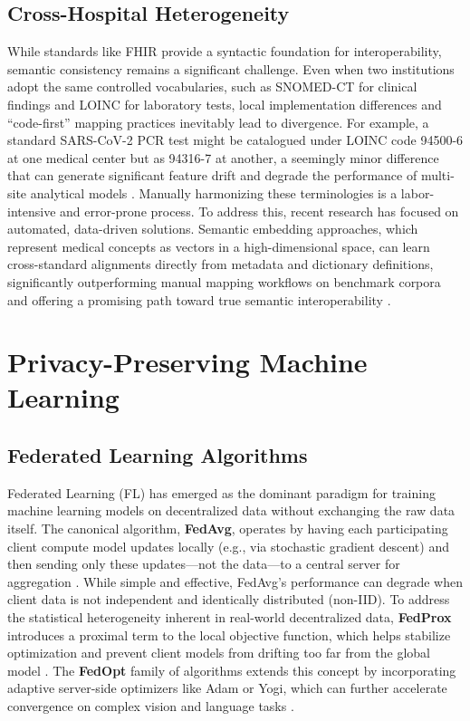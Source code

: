\documentclass[12pt]{report}
\begin{document}
\subsection{Cross-Hospital Heterogeneity}
While standards like FHIR provide a syntactic foundation for interoperability, semantic consistency remains a significant challenge. Even when two institutions adopt the same controlled vocabularies, such as SNOMED-CT for clinical findings and LOINC for laboratory tests, local implementation differences and “code-first” mapping practices inevitably lead to divergence. For example, a standard SARS-CoV-2 PCR test might be catalogued under LOINC code 94500-6 at one medical center but as 94316-7 at another, a seemingly minor difference that can generate significant feature drift and degrade the performance of multi-site analytical models \cite{Zhang2024Harmonize}. Manually harmonizing these terminologies is a labor-intensive and error-prone process. To address this, recent research has focused on automated, data-driven solutions. Semantic embedding approaches, which represent medical concepts as vectors in a high-dimensional space, can learn cross-standard alignments directly from metadata and dictionary definitions, significantly outperforming manual mapping workflows on benchmark corpora and offering a promising path toward true semantic interoperability \cite{Tu2022LOINC,Zhang2024Harmonize}.

\section{Privacy-Preserving Machine Learning}\label{sec:ppml}

\subsection{Federated Learning Algorithms}
Federated Learning (FL) has emerged as the dominant paradigm for training machine learning models on decentralized data without exchanging the raw data itself. The canonical algorithm, \textbf{FedAvg}, operates by having each participating client compute model updates locally (e.g., via stochastic gradient descent) and then sending only these updates—not the data—to a central server for aggregation \cite{McMahan2017FedAvg}. While simple and effective, FedAvg's performance can degrade when client data is not independent and identically distributed (non-IID). To address the statistical heterogeneity inherent in real-world decentralized data, \textbf{FedProx} introduces a proximal term to the local objective function, which helps stabilize optimization and prevent client models from drifting too far from the global model \cite{Li2020FedProx}. The \textbf{FedOpt} family of algorithms extends this concept by incorporating adaptive server-side optimizers like Adam or Yogi, which can further accelerate convergence on complex vision and language tasks \cite{Reddi2021FedOpt}.
\end{document}
